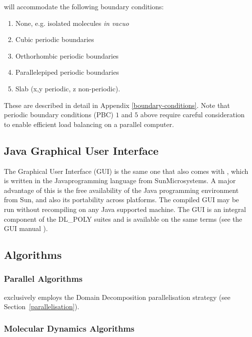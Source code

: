 \D will accommodate the following boundary conditions:
\begin{enumerate}
\item None, e.g. isolated molecules {\em in vacuo}
\item Cubic periodic boundaries
\item Orthorhombic periodic boundaries
\item Parallelepiped periodic boundaries
\item Slab (x,y periodic, z non-periodic).
\end{enumerate}

\noindent These are described in detail in Appendix
\ref{boundary-conditions}.  Note that periodic boundary conditions
(PBC) $1$ and $5$ above require careful consideration to enable
efficient load balancing on a parallel computer.

\subsection{Java Graphical User Interface}

The \D Graphical User Interface (GUI) is the same one that also comes with
\C, which is written in the Java\textregistered programming
language from Sun\textregistered Microsystems.  A major advantage
of this is the free availability of the Java programming environment
from Sun\textregistered, and also its portability across platforms.
The compiled GUI may be run without recompiling on any Java\textregistered
supported machine.  The GUI is an integral component of the DL\_POLY
suites and is available on the same terms (see the GUI manual \cite{smith-gui}).

\subsection{Algorithms}

\subsubsection{Parallel Algorithms}

\D exclusively employs the {Domain Decomposition}
 parallelisation
strategy \cite{pinches-91a,rapaport-91b,smith-91a,smith-93a} (see
Section~\ref{parallelisation}).

\subsubsection{Molecular Dynamics Algorithms}

